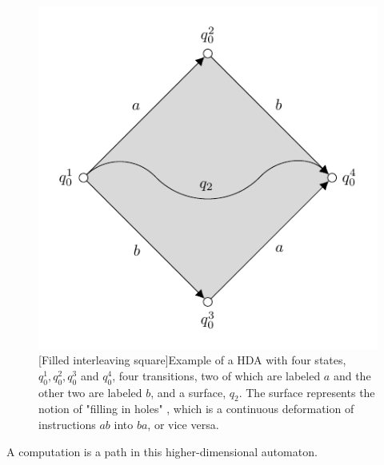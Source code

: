     \begin{figure}[ht]
        \centering
        \includegraphics[scale=1.2]{Figures/3.An-introduction-to-non-interleaving-models-for-concurrency/HDA_filled_interleaving_square/filled-interleaving-diamond.pdf}
         [Filled interleaving square]{Example of a HDA with four states, $q^1_0, q^2_0, q^3_0$ and $q^4_0$, four transitions, two of which are labeled $a$ and the other two are labeled $b$, and a surface, $q_2$. The surface represents the notion of "filling in holes" \cite[Section 2]{pratt91hda}, which is a continuous deformation of instructions $ab$ into $ba$, or vice versa.}
        \label{fig:HDA-filled-interleaving-square}
    \end{figure}
    
    A computation is a path in this higher-dimensional automaton.
    
